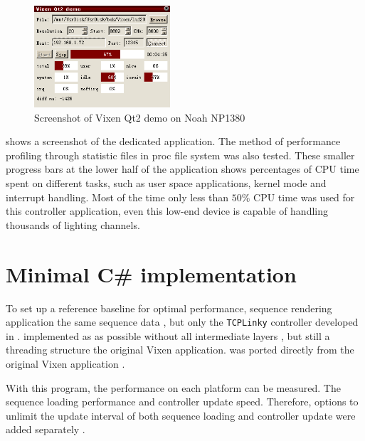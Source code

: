 \begin{figure}[t]
  \centering
  \includegraphics[width=0.45\textwidth]{Figs/vixen_noah.png}%
  \caption{\footnotesize Screenshot of Vixen Qt2 demo on Noah NP1380}
  \label{fig:vixen_noah}
\end{figure}

 shows a screenshot of the dedicated application. The method of performance profiling through statistic files in proc file system was also tested. These smaller progress bars at the lower half of the application shows percentages of CPU time spent on different tasks, such as user space applications, kernel mode and interrupt handling. Most of the time only less than $50 \%$ CPU time was used for this controller application,  even this low-end device is capable of handling thousands of lighting channels.

\section{Minimal C\# implementation}

To set up a reference baseline for optimal performance, sequence rendering application  the same  sequence data , but  only the \texttt{TCPLinky} controller developed in .  implemented as  as possible without all intermediate layers , but still  a threading structure  the original Vixen application.  was ported directly from the original Vixen application .

With this program, the  performance  on each platform can be measured. The  sequence loading performance and controller update speed. Therefore, options to unlimit the update interval of both sequence loading and controller update were added separately .

